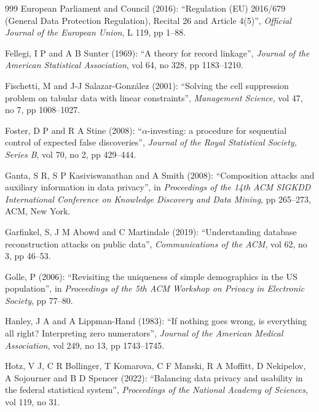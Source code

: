 \begin{thebibliography}{999}
European Parliament and Council (2016): ``Regulation (EU) 2016/679 (General Data Protection Regulation), Recital 26 and Article 4(5)'', \emph{Official Journal of the European Union}, L 119, pp 1--88.

Fellegi, I P and A B Sunter (1969): ``A theory for record linkage'', \emph{Journal of the American Statistical Association}, vol 64, no 328, pp 1183--1210.

Fischetti, M and J-J Salazar-Gonz\'alez (2001): ``Solving the cell suppression problem on tabular data with linear constraints'', \emph{Management Science}, vol 47, no 7, pp 1008--1027.

Foster, D P and R A Stine (2008): ``$\alpha$-investing: a procedure for sequential control of expected false discoveries'', \emph{Journal of the Royal Statistical Society, Series B}, vol 70, no 2, pp 429--444.

Ganta, S R, S P Kasiviswanathan and A Smith (2008): ``Composition attacks and auxiliary information in data privacy'', in \emph{Proceedings of the 14th ACM SIGKDD International Conference on Knowledge Discovery and Data Mining}, pp 265--273, ACM, New York.

Garfinkel, S, J M Abowd and C Martindale (2019): ``Understanding database reconstruction attacks on public data'', \emph{Communications of the ACM}, vol 62, no 3, pp 46--53.

Golle, P (2006): ``Revisiting the uniqueness of simple demographics in the US population'', in \emph{Proceedings of the 5th ACM Workshop on Privacy in Electronic Society}, pp 77--80.

Hanley, J A and A Lippman-Hand (1983): ``If nothing goes wrong, is everything all right? Interpreting zero numerators'', \emph{Journal of the American Medical Association}, vol 249, no 13, pp 1743--1745.

Hotz, V J, C R Bollinger, T Komarova, C F Manski, R A Moffitt, D Nekipelov, A Sojourner and B D Spencer (2022): ``Balancing data privacy and usability in the federal statistical system'', \emph{Proceedings of the National Academy of Sciences}, vol 119, no 31.


\end{thebibliography}
